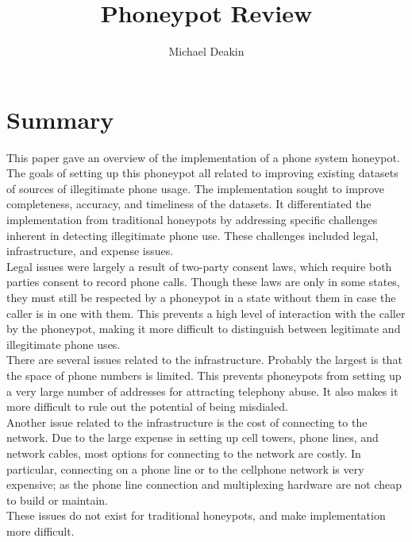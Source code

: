 \documentclass{article}
\title{Phoneypot Review}
\author{Michael Deakin}
\begin{document}
\maketitle
\section{Summary}
This paper gave an overview of the implementation of a phone system honeypot.
The goals of setting up this phoneypot all related to improving existing datasets of sources of illegitimate phone usage.
The implementation sought to improve completeness, accuracy, and timeliness of the datasets.
It differentiated the implementation from traditional honeypots by addressing specific challenges inherent in detecting illegitimate phone use.
These challenges included legal, infrastructure, and expense issues.\\
Legal issues were largely a result of two-party consent laws, which require both parties consent to record phone calls.
Though these laws are only in some states, they must still be respected by a phoneypot in a state without them in case the caller is in one with them.
This prevents a high level of interaction with the caller by the phoneypot, making it more difficult to distinguish between legitimate and illegitimate phone uses.\\
There are several issues related to the infrastructure.
Probably the largest is that the space of phone numbers is limited.
This prevents phoneypots from setting up a very large number of addresses for attracting telephony abuse.
It also makes it more difficult to rule out the potential of being misdialed.\\
Another issue related to the infrastructure is the cost of connecting to the network.
Due to the large expense in setting up cell towers, phone lines, and network cables, most options for connecting to the network are costly.
In particular, connecting on a phone line or to the cellphone network is very expensive;
as the phone line connection and multiplexing hardware are not cheap to build or maintain.\\
These issues do not exist for traditional honeypots,
and make implementation more difficult.\\
\end{document}
